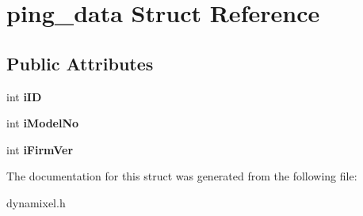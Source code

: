 \hypertarget{structping__data}{}\section{ping\+\_\+data Struct Reference}
\label{structping__data}
\subsection*{Public Attributes}
\begin{DoxyCompactItemize}
\item 
\hypertarget{structping__data_afa48124c46271b97615e464bfb0b31bc}{}int {\bfseries i\+I\+D}\label{structping__data_afa48124c46271b97615e464bfb0b31bc}

\item 
\hypertarget{structping__data_a21475c3d8b2629e66cd2c1227c648489}{}int {\bfseries i\+Model\+No}\label{structping__data_a21475c3d8b2629e66cd2c1227c648489}

\item 
\hypertarget{structping__data_a4a340fb47423b484b48237ceb5b39ef4}{}int {\bfseries i\+Firm\+Ver}\label{structping__data_a4a340fb47423b484b48237ceb5b39ef4}

\end{DoxyCompactItemize}


The documentation for this struct was generated from the following file\+:\begin{DoxyCompactItemize}
\item 
dynamixel.\+h\end{DoxyCompactItemize}
